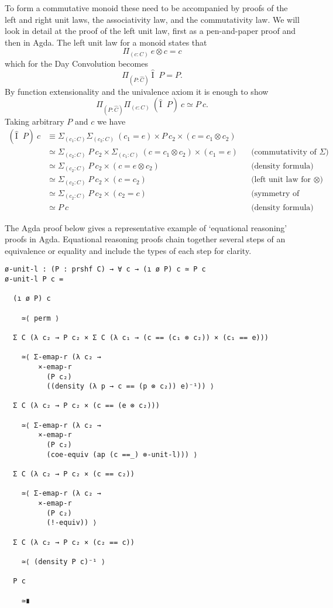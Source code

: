 \documentclass[12pt, parskip, DIV=14]{scrbook}
\DeclareMathOperator\daytensor{\widehat\otimes}
\newcommand{\dayid}{\operatorname{\hat{I}}}
\begin{document}
To form a commutative monoid these need to be accompanied by proofs of the left and right unit laws, the associativity law, and the commutativity law. We will look in detail at the proof of the left unit law, first as a pen-and-paper proof and then in Agda. The left unit law for a monoid states that
$$\Pi_{(c : C)}~e \otimes c = c$$
which for the Day Convolution becomes
$$\Pi_{(P : \widehat{C})}~\dayid \daytensor P = P.$$ By function extensionality and the univalence axiom it is enough to show
$$\Pi_{(P : \widehat{C})}\Pi_{(c : C)}~(\dayid \daytensor P)~c \simeq P~c.$$ Taking arbitrary $P$ and $c$ we have
\begin{align*}
  (\dayid \daytensor P)~c &\equiv \Sigma_{(c_1 : C)}\Sigma_{(c_2 : C)}~(c_1 = e) \times P~c_2 \times (c = c_1 \otimes c_2) \\
  &\simeq \Sigma_{(c_2 : C)}~P~c_2 \times \Sigma_{(c_1 : C)}~(c = c_1 \otimes c_2) \times (c_1 = e) &&\text{(commutativity of $\Sigma$)} \\
  &\simeq \Sigma_{(c_2 : C)}~P~c_2 \times (c = e \otimes c_2) &&\text{(density formula)} \\
  &\simeq \Sigma_{(c_2 : C)}~P~c_2 \times (c = c_2) &&\text{(left unit law for $\otimes$)} \\
  &\simeq \Sigma_{(c_2 : C)}~P~c_2 \times (c_2 = c) &&\text{(symmetry of paths)} \\
  &\simeq P~c &&\text{(density formula)}
\end{align*}

The Agda proof below gives a representative example of `equational reasoning' proofs in Agda. Equational reasoning proofs chain together several steps of an equivalence or equality and include the types of each step for clarity.

{\small
\begin{verbatim}
ø-unit-l : (P : prshf C) → ∀ c → (ı ø P) c ≃ P c
ø-unit-l P c =

  (ı ø P) c

    ≃⟨ perm ⟩

  Σ C (λ c₂ → P c₂ × Σ C (λ c₁ → (c == (c₁ ⊗ c₂)) × (c₁ == e)))

    ≃⟨ Σ-emap-r (λ c₂ →
        ×-emap-r
          (P c₂)
          ((density (λ p → c == (p ⊗ c₂)) e)⁻¹)) ⟩

  Σ C (λ c₂ → P c₂ × (c == (e ⊗ c₂)))

    ≃⟨ Σ-emap-r (λ c₂ →
        ×-emap-r
          (P c₂)
          (coe-equiv (ap (c ==_) ⊗-unit-l))) ⟩

  Σ C (λ c₂ → P c₂ × (c == c₂))

    ≃⟨ Σ-emap-r (λ c₂ →
        ×-emap-r
          (P c₂)
          (!-equiv)) ⟩

  Σ C (λ c₂ → P c₂ × (c₂ == c))

    ≃⟨ (density P c)⁻¹ ⟩

  P c

    ≃∎
\end{verbatim}}
\end{document}
